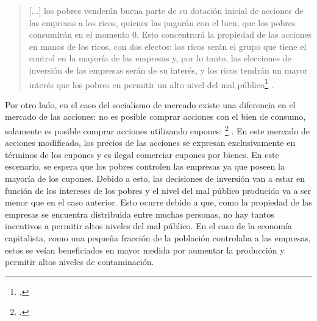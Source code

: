 \vspace{3mm}
\begin{quote}
   [...] los pobres venderán buena parte de su dotación inicial de acciones de las empresas a los ricos, quienes las pagarán con el bien, que los pobres consumirán en el momento 0. Esto concentrará la propiedad de las acciones en manos de los ricos, con dos efectos: los ricos serán el grupo que tiene el control en la mayoría de las empresas y, por lo tanto, las elecciones de inversión de las empresas serán de su interés, y los ricos tendrán un mayor interés que los pobres en permitir un alto nivel del mal público\footnote{ \citep[p. 68]{Roemer_1994}.} \citep[p. 68]{Roemer_1994}.
\end{quote}
\vspace{3mm}

Por otro lado, en el caso del socialismo de mercado existe una diferencia en el mercado de las acciones: no es posible comprar acciones con el bien de consumo, solamente es posible comprar acciones utilizando cupones: \footnote{ \citep[p. 66]{Roemer_1994}.} \citep[p. 66]{Roemer_1994}. En este mercado de acciones modificado, los precios de las acciones se expresan exclusivamente en términos de los cupones y es ilegal comerciar cupones por bienes. En este escenario, se espera que los pobres controlen las empresas ya que poseen la mayoría de los cupones. Debido a esto, las decisiones de inversión van a estar en función de los intereses de los pobres y el nivel del mal público producido va a ser menor que en el caso anterior. Esto ocurre debido a que, como la propiedad de las empresas se encuentra distribuida entre muchas personas, no hay tantos incentivos a permitir altos niveles del mal público. En el caso de la economía capitalista, como una pequeña fracción de la población controlaba a las empresas, estos se veían beneficiados en mayor medida por aumentar la producción y permitir altos niveles de contaminación.

